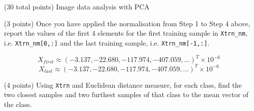 \documentclass[12pt]{article}
\begin{document}
\clearpage
%
%

\begin{question}{(30 total points) Image data analysis with PCA}

  
  

  
  \medskip

  \begin{subquestion}{(3 points)
      Once you have applied the normalisation from Step 1 to Step 4 above,
      report the values of the first 4 elements for the first training
      sample in \texttt{Xtrn\_nm},
      i.e. \texttt{Xtrn\_nm[0,:]} and the last training sample,
      i.e. \texttt{Xtrn\_nm[-1,:]}.
    } \label{Q1.1}
    

      \begin{answerbox}{10em}
      	$$X_{first} \approx (-3.137, -22.680, -117.974, -407.059, \ldots)^T \times 10^{-6}$$
      	$$X_{last} \approx (-3.137, -22.680, -117.974, -407.059, \ldots)^T \times 10^{-6}$$
      	      	
      \end{answerbox}
  


   \end{subquestion}
   \begin{subquestion}{(4 points)
      Using {\tt Xtrn} and Euclidean distance
      measure, for each class,
      find the two closest samples and two furthest
      samples of that class to the mean vector of the class.
    }  \label{Q1.2}





\end{subquestion}
\end{question}
\end{document}
